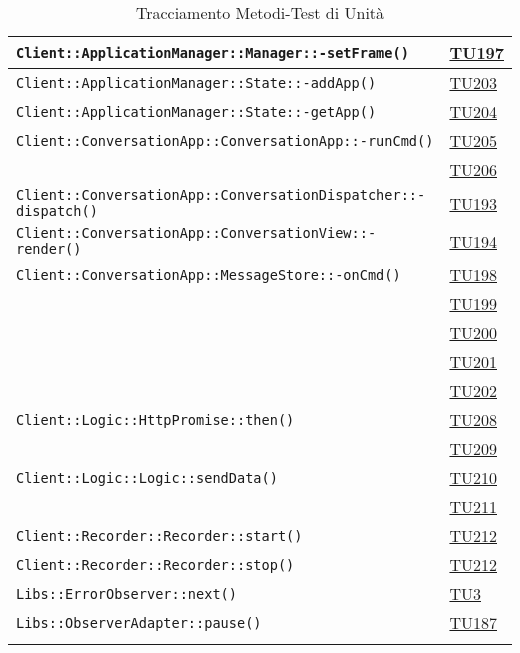 \begin{longtable}{|>{\centering}m{12cm}|m{1cm}<{\centering}|}
\texttt{Client::ApplicationManager::Manager::-\linebreak setFrame()} & \hyperlink{TU197}{TU197}\\ \hline
\texttt{Client::ApplicationManager::State::-\linebreak addApp()} & \hyperlink{TU203}{TU203}\\ \hline
\texttt{Client::ApplicationManager::State::-\linebreak getApp()} & \hyperlink{TU204}{TU204}\\ \hline
\texttt{Client::ConversationApp::ConversationApp::-\linebreak runCmd()} & \hyperlink{TU205}{TU205}\\ & \hyperlink{TU206}{TU206}\\ \hline
\texttt{Client::ConversationApp::ConversationDispatcher::-\linebreak dispatch()} & \hyperlink{TU193}{TU193}\\ \hline
\texttt{Client::ConversationApp::ConversationView::-\linebreak render()} & \hyperlink{TU194}{TU194}\\ \hline
\texttt{Client::ConversationApp::MessageStore::-\linebreak onCmd()} & \hyperlink{TU198}{TU198}\\ & \hyperlink{TU199}{TU199}\\ & \hyperlink{TU200}{TU200}\\ & \hyperlink{TU201}{TU201}\\ & \hyperlink{TU202}{TU202}\\ \hline
\texttt{Client::Logic::HttpPromise::then()} & \hyperlink{TU208}{TU208}\\ & \hyperlink{TU209}{TU209}\\ \hline
\texttt{Client::Logic::Logic::sendData()} & \hyperlink{TU210}{TU210}\\ & \hyperlink{TU211}{TU211}\\ \hline
\texttt{Client::Recorder::Recorder::start()} & \hyperlink{TU212}{TU212}\\ \hline
\texttt{Client::Recorder::Recorder::stop()} & \hyperlink{TU212}{TU212}\\ \hline
\texttt{Libs::ErrorObserver::next()} & \hyperlink{TU3}{TU3}\\ \hline
\texttt{Libs::ObserverAdapter::pause()} & \hyperlink{TU187}{TU187}\\ \hline

\caption[Tracciamento Metodi-Test di Unità]{Tracciamento Metodi-Test di Unità}
\label{tabella:met-tu}
\end{longtable}
\clearpage
